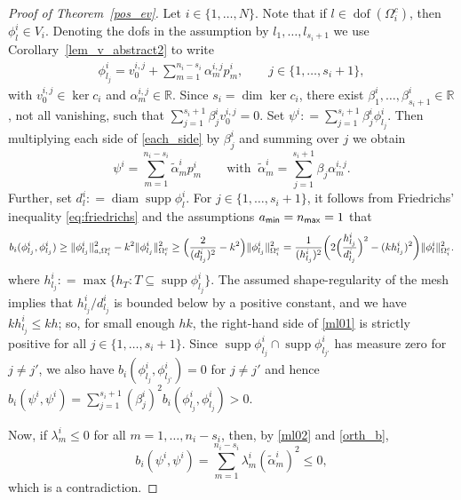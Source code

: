 \documentclass[numbers,webpdf,imaiai]{ima-authoring-template}%
\theoremstyle{thmstyletwo}%
\numberwithin{equation}{section}
\newcommand{\assign}{\mathrel{\mathop:}=}
\numberwithin{equation}{section}
\DeclareMathOperator{\supp}{supp}
\DeclareMathOperator{\diam}{diam}
\DeclareMathOperator{\dof}{dof}
\newcommand{\amin}{a_{\textup{\textsf{min}}}}
\newcommand{\nmax}{n_{\textup{\textsf{max}}}}
\begin{document}
{\begin{proof}[Proof of Theorem~\ref{pos_ev}]
Let $i\in\{1,\ldots,N\}$.  Note that if  $l \in \dof(\Omega_i^c)$, then $\phi_l^{{i}} \in V_i$. 
Denoting the dofs in the assumption by {$l_1,\ldots,l_{s_i+1}$} we use Corollary~\ref{lem_v_abstract2} to write
\begin{align}\label{each_side}
	\phi_{{l_j}}^{{i}} = v_0^{i,{j}} + \sum_{m=1}^{n_i-s_i}\alpha_m^{i,{j}} p_m^i,
	\qquad j\in\{1,\ldots,s_i+1\},
\end{align}
with $v_0^{i,j}\in\ker c_i$ and $\alpha_m^{i,j}\in\mathbb R$.
Since $s_i=\dim\ker c_i$, there exist $\beta_1^i,\ldots,\beta_{s_i+1}^i\in\mathbb R$, not all vanishing, 
such that $\sum_{j=1}^{s_i+1}\beta_j^i v_0^{i,j}=0$.
Set $\psi^i\assign\sum_{{j=1}}^{s_i+1}\beta_{{j}}^i\phi_{{l_j}}^i$.  
Then multiplying each side of \eqref{each_side} by $\beta_j^i$ and summing over $j$ we obtain  
\begin{equation}\label{ml02}
	\psi^i = \sum_{m=1}^{n_i-s_i}\widetilde{\alpha}_m^i p_m^i \qquad \text{with} \;\; 
	\widetilde{\alpha}_m^i = \sum_{j=1}^{s_i+1} \beta_j \alpha_m^{i,j}.
\end{equation}
Further, set $d_l^i \assign \diam \supp\phi_l^i$.
For $j\in\{1,\ldots,s_i+1\}$, it follows from Friedrichs' inequality \eqref{eq:friedrichs} and the assumptions $\amin = \nmax = 1$ that 
\begin{align}
	b_{i}(\phi_{l_j}^{{i}},\phi_{l_j}^{{i}})
	\ge\|\phi_{l_j}^i\|_{a,\Omega_i^c}^2 - k^2\|\phi_{l_j}^i\|_{\Omega_i^c}^2
	\ge \Bigl(\frac{2}{(d_{l_j}^i)^2}-k^2\Bigr)\|\phi_{l_j}^i\|_{\Omega_i^c}^2 
    = \frac{1}{(h_{l_j}^i)^{2}}\biggl(2\Bigl(\frac{h_{l_j}^i}{d_{l_j}^i}\Bigr)^2-(kh_{l_j}^i )^2\biggr)\|\phi_l^i\|_{\Omega_i^c}^2.
\label{ml01}
\end{align}
where $h_{l_j}^i \assign \max\{ h_T: T \subseteq \supp \phi_{l_j}^i\}$.
The assumed {shape-regularity} of the mesh implies that ${h_{l_j}^i/d_{l_j}^i}$ is bounded below by a positive constant,
and we have $k h_{l_j}^i \le kh$; so, for small enough $hk$, the right-hand side of \eqref{ml01}
is strictly positive for all $j\in\{1,\ldots,s_i+1\}$.
Since $\supp\phi_{l_j}^i\cap\supp\phi_{l_{j'}}^i$ has measure zero for $j\ne j'$, 
we also have $b_{i}(\phi_{l_j}^i,\phi_{l_{j'}}^i)=0$
for $j\ne j'$ and hence $b_{i}(\psi^i,\psi^i) = \sum_{j=1}^{s_i+1} (\beta_j^i)^2 b_i(\phi_{l_j}^i,\phi^i_{l_j}) > 0$.

Now, if $\lambda_m^i\le0$ for all $m=1,\ldots,n_i-s_i$, then, by \eqref{ml02} and \eqref{orth_b}, 
\[
	b_{i}(\psi^i,\psi^i) = \sum_{m=1}^{n_i-s_i}\lambda_m^i (\widetilde{\alpha}_m^i)^2 \le 0,
\]
which is a contradiction.
\end{proof}


}
\end{document}
